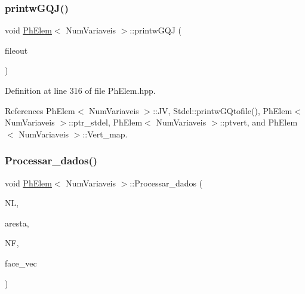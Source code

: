 \mbox{\label{classPhElem_a53eb1654e889d3fc893f50dcea12adcb}} 
\subsubsection{\texorpdfstring{printw\+G\+Q\+J()}{printwGQJ()}}
{\footnotesize\ttfamily void \hyperlink{classPhElem}{Ph\+Elem}$<$ Num\+Variaveis $>$\+::printw\+G\+QJ (\begin{DoxyParamCaption}\item[{F\+I\+LE $\ast$}]{fileout }\end{DoxyParamCaption})\hspace{0.3cm}{\ttfamily [inherited]}}



Definition at line 316 of file Ph\+Elem.\+hpp.



References Ph\+Elem$<$ Num\+Variaveis $>$\+::\+JV, Stdel\+::printw\+G\+Qtofile(), Ph\+Elem$<$ Num\+Variaveis $>$\+::ptr\+\_\+stdel, Ph\+Elem$<$ Num\+Variaveis $>$\+::ptvert, and Ph\+Elem$<$ Num\+Variaveis $>$\+::\+Vert\+\_\+map.

\mbox{\label{classPhElem_a6e4284fcb95240394293c1a576deb738}} 
\subsubsection{\texorpdfstring{Processar\+\_\+dados()}{Processar\_dados()}}
{\footnotesize\ttfamily void \hyperlink{classPhElem}{Ph\+Elem}$<$ Num\+Variaveis $>$\+::Processar\+\_\+dados (\begin{DoxyParamCaption}\item[{int \&}]{NL,  }\item[{std\+::vector$<$ \hyperlink{structARESTA}{A\+R\+E\+S\+TA} $>$ \&}]{aresta,  }\item[{int \&}]{NF,  }\item[{std\+::vector$<$ \hyperlink{structFACE}{F\+A\+CE} $>$ \&}]{face\+\_\+vec }\end{DoxyParamCaption})\hspace{0.3cm}{\ttfamily [inherited]}}



